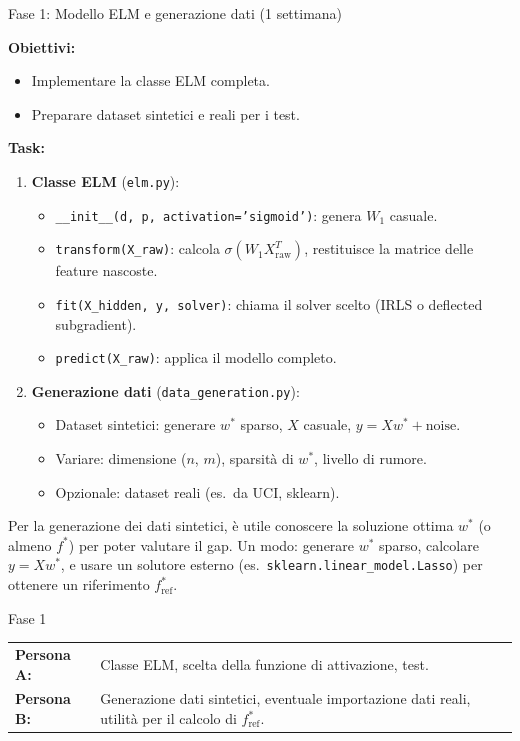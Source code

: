 \documentclass[a4paper,11pt]{article}
\begin{document}
\begin{phasebox}{Fase 1: Modello ELM e generazione dati (1 settimana)}

\textbf{Obiettivi:}
\begin{itemize}[nosep]
  \item Implementare la classe ELM completa.
  \item Preparare dataset sintetici e reali per i test.
\end{itemize}

\textbf{Task:}
\begin{enumerate}[nosep]
  \item \textbf{Classe ELM} (\texttt{elm.py}):
  \begin{itemize}[nosep]
    \item \texttt{\_\_init\_\_(d, p, activation='sigmoid')}: genera $W_1$ casuale.
    \item \texttt{transform(X\_raw)}: calcola $\sigma(W_1 X_{\text{raw}}^T)$, restituisce la matrice delle feature nascoste.
    \item \texttt{fit(X\_hidden, y, solver)}: chiama il solver scelto (IRLS o deflected subgradient).
    \item \texttt{predict(X\_raw)}: applica il modello completo.
  \end{itemize}
  \item \textbf{Generazione dati} (\texttt{data\_generation.py}):
  \begin{itemize}[nosep]
    \item Dataset sintetici: generare $w^*$ sparso, $X$ casuale, $y = Xw^* + \text{noise}$.
    \item Variare: dimensione ($n$, $m$), sparsità di $w^*$, livello di rumore.
    \item Opzionale: dataset reali (es.\ da UCI, sklearn).
  \end{itemize}
\end{enumerate}

\begin{tipbox}
Per la generazione dei dati sintetici, è utile conoscere la soluzione ottima $w^*$ (o almeno $f^*$) per poter valutare il gap. Un modo: generare $w^*$ sparso, calcolare $y = Xw^*$, e usare un solutore esterno (es.\ \texttt{sklearn.linear\_model.Lasso}) per ottenere un riferimento $f^*_{\text{ref}}$.
\end{tipbox}

\begin{splitbox}{Fase 1}
\begin{tabularx}{\textwidth}{lX}
\textbf{Persona A:} & Classe ELM, scelta della funzione di attivazione, test. \\
\textbf{Persona B:} & Generazione dati sintetici, eventuale importazione dati reali, utilità per il calcolo di $f^*_{\text{ref}}$. \\
\end{tabularx}
\end{splitbox}
\end{phasebox}
\end{document}

